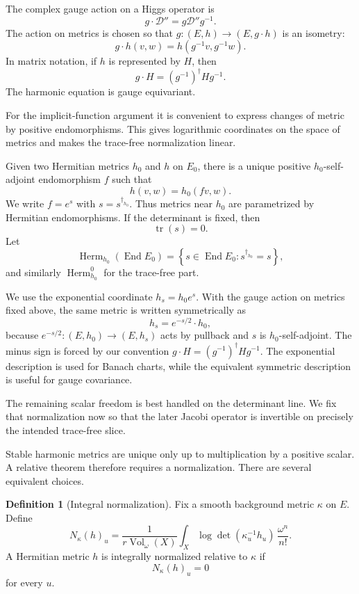 \documentclass[11pt,reqno]{amsart}
\theoremstyle{definition}
\newtheorem{definition}[theorem]{Definition}
\theoremstyle{remark}
\newcommand{\cD}{\mathcal D}
\newcommand{\End}{\operatorname{End}}
\newcommand{\Herm}{\operatorname{Herm}}
\newcommand{\tr}{\operatorname{tr}}
\newcommand{\Vol}{\operatorname{Vol}}
\newcommand{\set}[1]{\left\{#1\right\}}
\begin{document}
The complex gauge action on a Higgs operator is
\[
  g\cdot\cD''=g\cD''g^{-1}.
\]
The action on metrics is chosen so that $g:(E,h)\to(E,g\cdot h)$ is an isometry:
\[
  g\cdot h(v,w)=h(g^{-1}v,g^{-1}w).
\]
In matrix notation, if $h$ is represented by $H$, then
\[
  g\cdot H=(g^{-1})^\dagger H g^{-1}.
\]
The harmonic equation is gauge equivariant.


For the implicit-function argument it is convenient to express changes of metric by positive endomorphisms.  This gives logarithmic coordinates on the space of metrics and makes the trace-free normalization linear.


Given two Hermitian metrics $h_0$ and $h$ on $E_0$, there is a unique positive $h_0$-self-adjoint endomorphism $f$ such that
\[
  h(v,w)=h_0(fv,w).
\]
We write $f=e^s$ with $s=s^{\dagger_{h_0}}$.  Thus metrics near $h_0$ are parametrized by Hermitian endomorphisms.  If the determinant is fixed, then
\[
  \tr(s)=0.
\]
Let
\[
  \Herm_{h_0}(\End E_0)
  =\set{s\in\End E_0:s^{\dagger_{h_0}}=s},
\]
and similarly $\Herm_{h_0}^0$ for the trace-free part.

We use the exponential coordinate $h_s=h_0e^s$.  With the gauge action
on metrics fixed above, the same metric is written symmetrically as
\[
  h_s=e^{-s/2}\cdot h_0,
\]
because $e^{-s/2}:(E,h_0)\to(E,h_s)$ acts by pullback and $s$ is
$h_0$-self-adjoint.  The minus sign is forced by our convention
$g\cdot H=(g^{-1})^\dagger Hg^{-1}$.  The exponential description is
used for Banach charts, while the equivalent symmetric description is
useful for gauge covariance.


The remaining scalar freedom is best handled on the determinant line.  We fix that normalization now so that the later Jacobi operator is invertible on precisely the intended trace-free slice.


Stable harmonic metrics are unique only up to multiplication by a positive scalar.  A relative theorem therefore requires a normalization.  There are several equivalent choices.

\begin{definition}[Integral normalization]\label{def:integral-normalization}
Fix a smooth background metric $\kappa$ on $E$.  Define
\[
  N_\kappa(h)_u
  =\frac{1}{r\Vol_\omega(X)}
  \int_X \log\det(\kappa_u^{-1}h_u)\,\frac{\omega^n}{n!}.
\]
A Hermitian metric $h$ is integrally normalized relative to $\kappa$ if
\begin{equation}\label{eq:integral-normalization}
  N_\kappa(h)_u=0
\end{equation}
for every $u$.
\end{definition}
\end{document}
